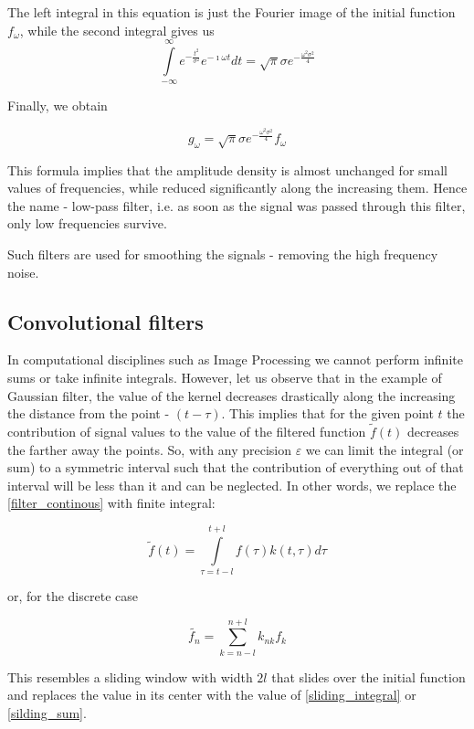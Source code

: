 \documentclass[11pt]{book}
\begin{document}
The left integral in this equation is just the Fourier image of the initial function $f_\omega$, while the second integral gives us
\begin{equation}
\int\limits_{-\infty}^\infty e^{-\frac {t^2}{\sigma^2}} e^{-\imath\omega t }dt = \sqrt{\pi} \sigma e^{-\frac{\omega^2 \sigma^2}{4}}
\end{equation}

Finally, we obtain

\begin{equation}
g_\omega = \sqrt{\pi} \sigma e^{-\frac{\omega^2 \sigma^2}{4}} f_\omega
\end{equation}

This formula implies that the amplitude density is almost unchanged for small values of frequencies, while reduced significantly along the increasing them. Hence the name - low-pass filter, i.e. as soon as the signal was passed through this filter, only low frequencies survive. 

Such filters are used for smoothing the signals - removing the high frequency noise.

\subsection{Convolutional filters}

In computational disciplines such as Image Processing we cannot perform infinite sums or take infinite integrals. However, let us observe that in the example of Gaussian filter, the value of the kernel decreases drastically along the increasing the distance from the point - $(t-\tau)$. This implies that for the given point $t$ the contribution of signal values to the value of the filtered function $\tilde{f}(t)$ decreases the farther away the points. So, with any precision $\varepsilon$ we can limit the integral (or sum) to a symmetric interval such that the contribution of everything out of that interval will be less than it and can be neglected. In other words, we replace the \eqref{filter_continous}  with finite integral:

\begin{equation}
\tilde{f}(t) = \int\limits_{\tau = t -l}^{t+l}f(\tau) k(t,\tau) d\tau\label{sliding_integral}
\end{equation}

or, for the discrete case

\begin{equation}
\tilde{f_n} = \sum\limits_{k= n-l}^{n+l} k_{nk}f_k\label{silding_sum}
\end{equation}

This resembles a sliding window with width $2l$ that slides over the initial function and replaces the value in its center with the value  of \eqref{sliding_integral} or \eqref{silding_sum}.








\backmatter
\end{document}
